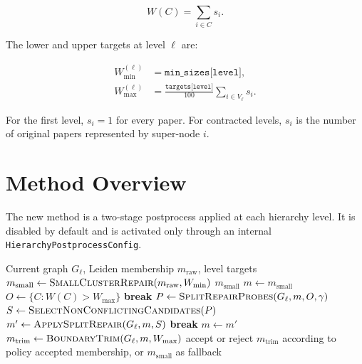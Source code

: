 \documentclass[11pt,a4paper]{article}
\begin{document}
\begin{equation}
    W(C) = \sum_{i \in C} s_i.
\end{equation}

The lower and upper targets at level $\ell$ are:

\begin{align}
    W_{\min}^{(\ell)} &= \texttt{min\_sizes[level]}, \\
    W_{\max}^{(\ell)} &= \frac{\texttt{targets[level]}}{100}
                         \sum_{i \in V_\ell} s_i.
\end{align}

For the first level, $s_i=1$ for every paper. For contracted levels, $s_i$ is
the number of original papers represented by super-node $i$.

\section{Method Overview}

The new method is a two-stage postprocess applied at each hierarchy level.
It is disabled by default and is activated only through an internal
\texttt{HierarchyPostprocessConfig}.

\begin{algorithm}[h]
\caption{Level-wise two-stage hierarchy postprocess}
\begin{algorithmic}[1]
\REQUIRE Current graph $G_\ell$, Leiden membership $m_{\text{raw}}$, level targets
\STATE $m_{\text{small}} \leftarrow \textsc{SmallClusterRepair}(m_{\text{raw}}, W_{\min})$
    \STATE \RETURN $m_{\text{small}}$
\ENDIF
\STATE $m \leftarrow m_{\text{small}}$
    \STATE $O \leftarrow \{C : W(C) > W_{\max}\}$
        \STATE \textbf{break}
    \ENDIF
    \STATE $P \leftarrow \textsc{SplitRepairProbes}(G_\ell, m, O, \gamma)$
    \STATE $S \leftarrow \textsc{SelectNonConflictingCandidates}(P)$
    \STATE $m' \leftarrow \textsc{ApplySplitRepair}(G_\ell, m, S)$
        \STATE \textbf{break}
    \ENDIF
    \STATE $m \leftarrow m'$
\ENDFOR
\STATE $m_{\text{trim}} \leftarrow \textsc{BoundaryTrim}(G_\ell, m, W_{\max})$
\STATE accept or reject $m_{\text{trim}}$ according to policy
\RETURN accepted membership, or $m_{\text{small}}$ as fallback
\end{algorithmic}
\end{algorithm}
\end{document}
